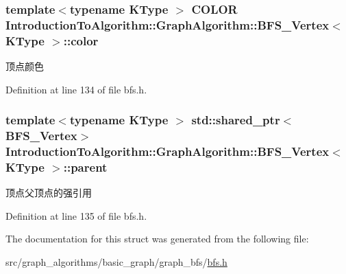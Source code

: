 \subsubsection[{color}]{\setlength{\rightskip}{0pt plus 5cm}template$<$typename K\+Type $>$ {\bf C\+O\+L\+O\+R} {\bf Introduction\+To\+Algorithm\+::\+Graph\+Algorithm\+::\+B\+F\+S\+\_\+\+Vertex}$<$ K\+Type $>$\+::color}\label{struct_introduction_to_algorithm_1_1_graph_algorithm_1_1_b_f_s___vertex_a7ab527ab8514bcb65e56edbe62b28fbb}
顶点颜色 

Definition at line 134 of file bfs.\+h.

\hypertarget{struct_introduction_to_algorithm_1_1_graph_algorithm_1_1_b_f_s___vertex_a11202710469656d7fb04635430355c41}{}
\subsubsection[{parent}]{\setlength{\rightskip}{0pt plus 5cm}template$<$typename K\+Type $>$ std\+::shared\+\_\+ptr$<${\bf B\+F\+S\+\_\+\+Vertex}$>$ {\bf Introduction\+To\+Algorithm\+::\+Graph\+Algorithm\+::\+B\+F\+S\+\_\+\+Vertex}$<$ K\+Type $>$\+::parent}\label{struct_introduction_to_algorithm_1_1_graph_algorithm_1_1_b_f_s___vertex_a11202710469656d7fb04635430355c41}
顶点父顶点的强引用 

Definition at line 135 of file bfs.\+h.



The documentation for this struct was generated from the following file\+:\begin{DoxyCompactItemize}
\item 
src/graph\+\_\+algorithms/basic\+\_\+graph/graph\+\_\+bfs/\hyperlink{bfs_8h}{bfs.\+h}\end{DoxyCompactItemize}
